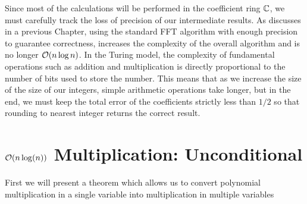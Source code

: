 Since most of the calculations will be performed in the coefficient ring ${\mathbb C}$, we must carefully track the loss of precision of our intermediate results. As discusses in a previous Chapter, using the standard FFT algorithm with enough precision to guarantee correctness, increases the complexity of the overall algorithm and is no longer $\mathcal O(n \log n)$. In the Turing model, the complexity of fundamental operations such as addition and multiplication is directly proportional to the number of bits used to store the number. This means that as we increase the size of the size of our integers, simple arithmetic operations take longer, but in the end, we must keep the total error of the coefficients strictly less than $1/2$ so that rounding to nearest integer returns the correct result. 





\section{$\mathcal O(n\log(n))$ Multiplication: Unconditional}
\label{subsec:nlogn}

First we will present a theorem which allows us to convert polynomial multiplication in a single variable into multiplication in multiple variables

